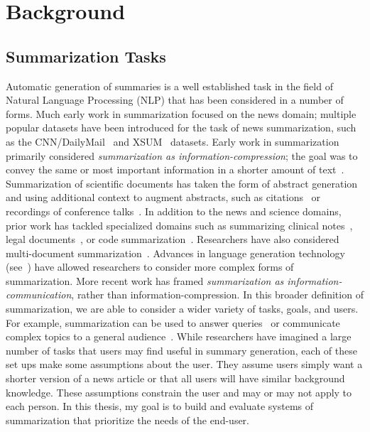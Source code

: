 \chapter{Background} \label{chap:background}


\section{Summarization Tasks}\label{sec:background-tasks}

Automatic generation of summaries is a well established task in the field of Natural Language Processing (NLP) that has been considered in a number of forms. Much early work in summarization focused on the news domain; multiple popular datasets have been introduced for the task of news summarization, such as the CNN/DailyMail~\cite{see-etal-2017-get} and XSUM~\cite{xsum-narayan-etal-2018-dont} datasets. Early work in summarization primarily considered \textit{summarization as information-compression}; the goal was to convey the same or most important information in a shorter amount of text~\cite{knight2002summarization, clarke2008global}. Summarization of scientific documents has taken the form of abstract generation~\cite{cohan2018discourse} and using additional context to augment abstracts, such as citations~\cite{Qazvinian2008ScientificPS, Cohan2015ScientificAS} or recordings of conference talks~\cite{Lev2019TalkSummAD}. In addition to the news and science domains, prior work has tackled specialized domains such as summarizing clinical notes~\cite{Abacha2023OverviewOT}, legal documents~\cite{Takale2023ASO}, or code summarization~\cite{Ahmad2020ATA}. Researchers have also considered multi-document summarization~\cite{DeYoung2021MS2MS, Fabbri2019MultiNewsAL}. Advances in language generation technology (see~) have allowed researchers to consider more complex forms of summarization. More recent work has framed \textit{summarization as information-communication}, rather than information-compression. In this broader definition of summarization, we are able to consider a wider variety of tasks, goals, and users. For example, summarization can be used to answer queries~\cite{Nema2017DiversityDA, Fok2023QlarifyRE} or communicate complex topics to a general audience~\cite{goldsack2022making,Zaman2020HTSSAN}.  While researchers have imagined a large number of tasks that users may find useful in summary generation, each of these set ups make some assumptions about the user. They assume users simply want a shorter version of a news article or that all users will have similar background knowledge. These assumptions  constrain the user and may or may not apply to each person. In this thesis, my goal is to build and evaluate systems of summarization that prioritize the needs of the end-user.


